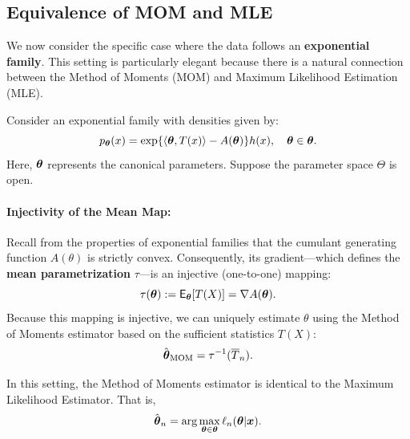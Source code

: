 \subsection*{Equivalence of MOM and MLE}

We now consider the specific case where the data follows an \textbf{exponential family}. This setting is particularly elegant because there is a natural connection between the Method of Moments (MOM) and Maximum Likelihood Estimation (MLE).

Consider an exponential family with densities given by:
\[
p_{\boldsymbol{\theta}}(x) = \exp\{\langle \boldsymbol{\theta}, T(x) \rangle - A(\boldsymbol{\theta})\}h(x), \quad \boldsymbol{\theta} \in \boldsymbol{\theta}.
\]
Here, $\boldsymbol{\theta}$ represents the canonical parameters. Suppose the parameter space $\Theta$ is open.



\paragraph{Injectivity of the Mean Map:}
Recall from the properties of exponential families that the cumulant generating function $A(\theta)$ is strictly convex. Consequently, its gradient—which defines the \textbf{mean parametrization} $\tau$—is an injective (one-to-one) mapping:
\[
\tau(\boldsymbol{\theta}) := \mathsf{E}_{\boldsymbol{\theta}}[T(X)] = \nabla A(\boldsymbol{\theta}).
\]
Because this mapping is injective, we can uniquely estimate $\theta$ using the Method of Moments estimator based on the sufficient statistics $T(X)$:
\[
\hat{\boldsymbol{\theta}}_{\text{MOM}} = \tau^{-1}(\overline{T}_n).
\]

\begin{claim}
In this setting, the Method of Moments estimator is identical to the Maximum Likelihood Estimator. That is,
\[
\hat{\boldsymbol{\theta}}_n = \arg\max_{\boldsymbol{\theta} \in \boldsymbol{\theta}} \ell_n(\boldsymbol{\theta}|\boldsymbol{x}).
\]
\end{claim}

